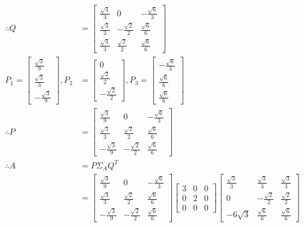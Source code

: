 \documentclass[12pt, a4paper]{scrartcl}
\begin{document}
\begin{enumerate}
\begin{enumerate}
\begin{align*}
                    \\ \therefore Q &= \begin{bmatrix}
                        \frac{\sqrt{3}}{3}&0&-\frac{\sqrt{6}}{3}\\\frac{\sqrt{3}}{3}&-\frac{\sqrt{2}}{2}&\frac{\sqrt{6}}{6}\\\frac{\sqrt{3}}{3}&\frac{\sqrt{2}}{2}&\frac{\sqrt{6}}{6}
                    \end{bmatrix}
                    \\ P_1 = \begin{bmatrix}
                        \frac{\sqrt{3}}{9}\\\frac{\sqrt{3}}{3}\\-\frac{\sqrt{3}}{9}
                    \end{bmatrix}
                    , P_2 &= \begin{bmatrix}
                        0\\\frac{\sqrt{2}}{2}\\-\frac{\sqrt{2}}{2}
                    \end{bmatrix}
                    , P_3 = \begin{bmatrix}
                        -\frac{\sqrt{6}}{3}\\\frac{\sqrt{6}}{6}\\\frac{\sqrt{6}}{6}
                    \end{bmatrix}
                    \\ \therefore P &= \begin{bmatrix}
                        \frac{\sqrt{3}}{9}&0&-\frac{\sqrt{6}}{3}\\\frac{\sqrt{3}}{3}&\frac{\sqrt{2}}{2}&\frac{\sqrt{6}}{6}\\-\frac{\sqrt{3}}{9}&-\frac{\sqrt{2}}{2}&\frac{\sqrt{6}}{6}
                    \end{bmatrix}
                    \\ \therefore A &= P\Sigma_AQ^T
                    \\ &=\begin{bmatrix}
                        \frac{\sqrt{3}}{9}&0&-\frac{\sqrt{6}}{3}\\\frac{\sqrt{3}}{3}&\frac{\sqrt{2}}{2}&\frac{\sqrt{6}}{6}\\-\frac{\sqrt{3}}{9}&-\frac{\sqrt{2}}{2}&\frac{\sqrt{6}}{6}
                    \end{bmatrix}\begin{bmatrix}
                        3&0&0\\0&2&0\\0&0&0
                    \end{bmatrix}\begin{bmatrix}
                        \frac{\sqrt{3}}{3}&\frac{\sqrt{3}}{3}&\frac{\sqrt{3}}{3}\\0&-\frac{\sqrt{2}}{2}&\frac{\sqrt{2}}{2}\\-6\sqrt{3}&\frac{\sqrt{6}}{6}&\frac{\sqrt{6}}{6}
                    \end{bmatrix}
                \end{align*}


\end{enumerate}
\end{enumerate}
\end{document}
